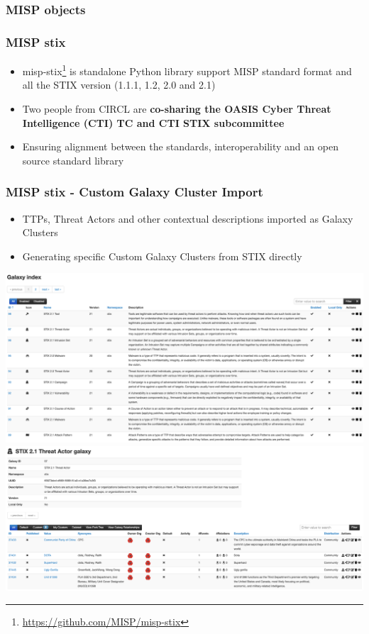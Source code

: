 \begin{frame}
    \frametitle{MISP objects}
\end{frame}

\begin{frame}
     \frametitle{MISP stix}
     \begin{itemize}
        \item misp-stix\footnote{\url{https://github.com/MISP/misp-stix}} is standalone Python library support MISP standard format and all the STIX version (1.1.1, 1.2, 2.0 and 2.1)
        \item Two people from CIRCL are {\bf co-sharing the OASIS Cyber Threat Intelligence (CTI) TC and CTI STIX subcommittee}
        \item Ensuring alignment between the standards, interoperability and an open source standard library
     \end{itemize}
\end{frame}

\begin{frame}
     \frametitle{MISP stix - Custom Galaxy Cluster Import}
     \begin{itemize}
	\item TTPs, Threat Actors and other contextual descriptions imported as Galaxy Clusters
	\item Generating specific Custom Galaxy Clusters from STIX directly
     \end{itemize}
     \begin{center}
	  \includegraphics[scale=0.1]{stix-cluster.png}
	  \includegraphics[scale=0.1]{stix-cluster2.png}
     \end{center}
\end{frame}

